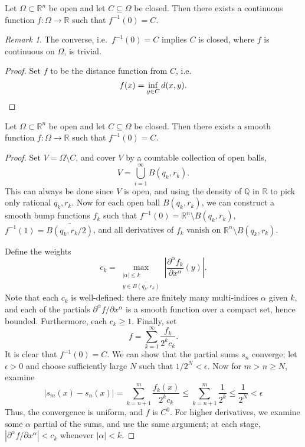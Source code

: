 \documentclass[11pt]{article}
\newcommand{\R}{\mathbb{R}}
\newcommand{\Q}{\mathbb{Q}}
\newcommand{\ppn}[3][]{\frac{\partial^{#1} #2}{\partial #3^{#1}}}
\theoremstyle{definition}
\theoremstyle{remark}
\newtheorem*{remark}{Remark}
\numberwithin{equation}{section}
\begin{document}
    \begin{lemma}
        Let $\Omega \subset \R^n$ be open and let $C \subseteq \Omega$ be closed.
        Then there exists a continuous function $f\colon \Omega \to \R$ such that
        $f^{-1}(0) = C$.
        \begin{remark}
            The converse, i.e.\ $f^{-1}(0) = C$ implies $C$ is closed, where $f$ is
            continuous on $\Omega$, is trivial.
        \end{remark}
    \end{lemma}
    \begin{proof}
        Set $f$ to be the distance function from $C$, i.e.\ \[
            f(x) = \inf_{y \in C} d(x, y). \qedhere
        \] 
    \end{proof}

    \begin{theorem}
        Let $\Omega \subset \R^n$ be open and let $C \subseteq \Omega$ be closed.
        Then there exists a smooth function $f\colon \Omega \to \R$ such that
        $f^{-1}(0) = C$.
    \end{theorem}
    \begin{proof}
        Set $V = \Omega\setminus C$, and cover $V$ by a countable collection of open
        balls, \[
            V = \bigcup_{i = 1}^\infty B(q_k, r_k).
        \] This can always be done since $V$ is open, and using the density of $\Q$
        in $\R$ to pick only rational $q_k, r_k$. Now for each open ball $B(q_k,
        r_k)$, we can construct a smooth bump functions $f_k$ such that $f^{-1}(0) =
        \R^n\setminus B(q_k, r_k)$, $f^{-1}(1) = \overline{B(q_k, r_k / 2)}$, and all
        derivatives of $f_k$ vanish on $\R^n\setminus B(q_k, r_k)$.

        Define the weights \[
            c_k = \max_{\substack{|\alpha| \leq k \\ y \in \overline{B(q_k, r_k)}}}
            \left|\ppn[\alpha]{f_k}{x}(y)\right|.
        \] Note that each $c_k$ is well-defined: there are finitely many multi-indices
        $\alpha$ given $k$, and each of the partials $\partial^\alpha f / \partial
        x^\alpha$ is a smooth function over a compact set, hence bounded.
        Furthermore, each $c_k \geq 1$. Finally, set \[
            f = \sum_{k = 1}^\infty \frac{f_k}{2^k c_k}.
        \] It is clear that $f^{-1}(0) = C$. We can show that the partial sums $s_n$
        converge; let $\epsilon > 0$ and choose sufficiently large $N$ such that $1 /
        2^N < \epsilon$. Now for $m > n \geq N$, examine \[
            |s_m(x) - s_n(x)| = \sum_{k = n + 1}^m \frac{f_k(x)}{2^k c_k} \leq
            \sum_{k = n + 1}^m \frac{1}{2^k} \leq \frac{1}{2^N} < \epsilon
        \] Thus, the convergence is uniform, and $f$ is $C^0$. For higher
        derivatives, we examine some $\alpha$ partial of the sums, and use the same
        argument; at each stage, $|\partial^\alpha f/ \partial x^\alpha| < c_k$
        whenever $|\alpha| < k$.
    \end{proof}
\end{document}
